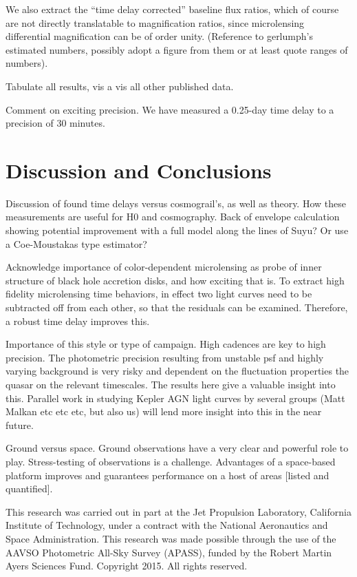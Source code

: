 \documentclass[iop]{emulateapj}
\begin{document}
We also extract the ``time delay corrected'' baseline flux ratios,
which of course are not directly translatable to magnification ratios,
since microlensing differential magnification can be of order unity.
(Reference to gerlumph's estimated numbers, possibly adopt a figure
from them or at least quote ranges of numbers).  

Tabulate all results, vis a vis all other published data.  

Comment on exciting precision.  We have measured a 0.25-day time delay
to a precision of 30 minutes. 

\section{Discussion and Conclusions}

Discussion of found time delays versus cosmograil's, as well as
theory.  How these measurements are useful for H0 and cosmography.
Back of envelope calculation showing potential improvement with a full
model along the lines of Suyu?  Or use a Coe-Moustakas type estimator?  

Acknowledge importance of color-dependent microlensing as probe of
inner structure of black hole accretion disks, and how exciting that
is.  To extract high fidelity microlensing time behaviors, in effect
two light curves need to be subtracted off from each other, so that
the residuals can be examined.  Therefore, a robust time delay
improves this.  

Importance of this style or type of campaign.  High cadences are key
to high precision.  The photometric precision resulting from unstable
psf and highly varying background is very risky and dependent on the
fluctuation properties the quasar on the relevant timescales.  The
results here give a valuable insight into this.  Parallel work in
studying Kepler AGN light curves by several groups (Matt Malkan etc
etc etc, but also us) will lend more insight into this in the near
future.  

Ground versus space. Ground observations have a very clear and
powerful role to play.  Stress-testing of observations is a
challenge.  Advantages of a space-based platform improves and
guarantees performance on a host of areas [listed and quantified].  

\acknowledgements

This research was carried out in part at the Jet Propulsion
Laboratory, California Institute of Technology, under a contract with
the National Aeronautics and Space Administration.  This research was
made possible through the use of the AAVSO Photometric All-Sky Survey
(APASS), funded by the Robert Martin Ayers Sciences Fund.  Copyright
2015. All rights reserved.





\end{document}
